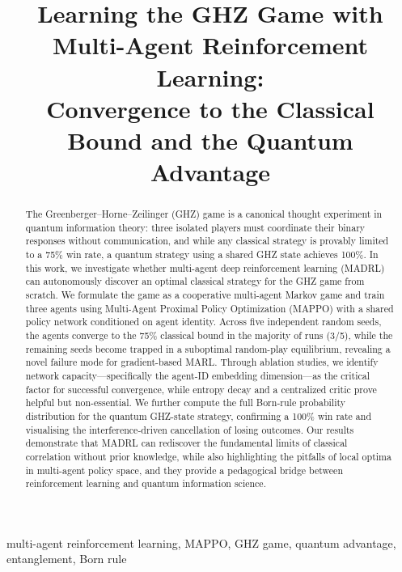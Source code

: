 \documentclass[conference]{IEEEtran}
\begin{document}
\title{Learning the GHZ Game with Multi-Agent Reinforcement Learning: \\ Convergence to the Classical Bound and the Quantum Advantage}

\author{
}

\maketitle

\begin{abstract}
The Greenberger--Horne--Zeilinger (GHZ) game is a canonical thought experiment in quantum information theory: three isolated players must coordinate their binary responses without communication, and while any classical strategy is provably limited to a 75\% win rate, a quantum strategy using a shared GHZ state achieves 100\%. In this work, we investigate whether multi-agent deep reinforcement learning (MADRL) can autonomously discover an optimal classical strategy for the GHZ game from scratch. We formulate the game as a cooperative multi-agent Markov game and train three agents using Multi-Agent Proximal Policy Optimization (MAPPO) with a shared policy network conditioned on agent identity. Across five independent random seeds, the agents converge to the 75\% classical bound in the majority of runs (3/5), while the remaining seeds become trapped in a suboptimal random-play equilibrium, revealing a novel failure mode for gradient-based MARL. Through ablation studies, we identify network capacity---specifically the agent-ID embedding dimension---as the critical factor for successful convergence, while entropy decay and a centralized critic prove helpful but non-essential. We further compute the full Born-rule probability distribution for the quantum GHZ-state strategy, confirming a 100\% win rate and visualising the interference-driven cancellation of losing outcomes. Our results demonstrate that MADRL can rediscover the fundamental limits of classical correlation without prior knowledge, while also highlighting the pitfalls of local optima in multi-agent policy space, and they provide a pedagogical bridge between reinforcement learning and quantum information science.
\end{abstract}

\begin{IEEEkeywords}
multi-agent reinforcement learning, MAPPO, GHZ game, quantum advantage, entanglement, Born rule
\end{IEEEkeywords}
\end{document}
